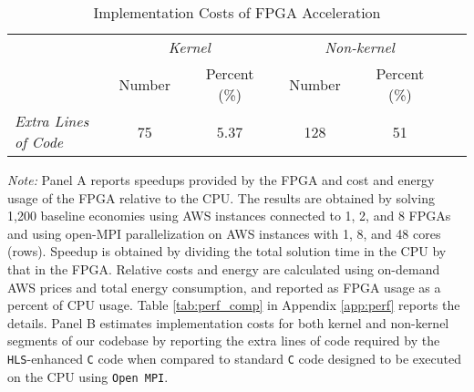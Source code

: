 \documentclass[12pt,american]{article}
\makeatletter
\newcommand{\extraLinesKernel}{75}
\newcommand{\extraLinesKernelpercent}{5.37}
\newcommand{\extraLinesNonkernel}{128}
\newcommand{\extraLinesNonkernelpercent}{51}
\newcommand{\numbeconII}{1,200\@\xspace}
\makeatother
\begin{document}
\begin{table}[ht!]
\begin{center}
\begin{subtable}{\textwidth}
\caption{Implementation Costs of FPGA Acceleration}
\label{tab:baseline:B} %
\begin{tabularx}{\textwidth}{p{4.5cm}XXXXXXXXXX}
\toprule
&&\multicolumn{3}{c}{\textit{Kernel}}&&\multicolumn{3}{c}{\textit{Non-kernel}}& \\
&&\multicolumn{1}{c}{Number}&&\multicolumn{1}{c}{Percent (\%)}&&\multicolumn{1}{c}{Number}&&\multicolumn{1}{c}{Percent (\%)} \\
\cmidrule{3-5}\cmidrule{7-9}
\textit{Extra Lines of Code} &&\multicolumn{1}{c}{\extraLinesKernel}&&\multicolumn{1}{c}{\extraLinesKernelpercent}&&\multicolumn{1}{c}{\extraLinesNonkernel}&&\multicolumn{1}{c}{\extraLinesNonkernelpercent} \\
\bottomrule
\end{tabularx}
\end{subtable}
\end{center}
\small \textit{Note:} Panel A reports speedups provided by the FPGA and cost and energy usage of the FPGA relative to the CPU. The results are obtained by solving \numbeconII baseline economies using AWS instances connected to 1, 2, and 8 FPGAs and using open-MPI parallelization on AWS instances with 1, 8, and 48 cores (rows). Speedup is obtained by dividing the total solution time in the CPU by that in the FPGA. Relative costs and energy are calculated using on-demand AWS prices and total energy consumption, and reported as FPGA usage as a percent of CPU usage. Table \ref{tab:perf_comp} in Appendix \ref{app:perf} reports the details. Panel B estimates implementation costs for both kernel and non-kernel segments of our codebase by reporting the extra lines of code required by the \texttt{HLS}-enhanced \texttt{C} code when compared to standard \texttt{C} code designed to be executed on the CPU using \texttt{Open MPI}.
\end{table}
\end{document}
